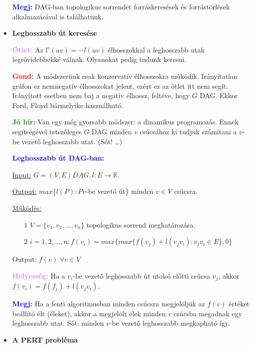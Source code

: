 \documentclass[../../szobeli.tex]{subfiles}
\begin{document}
\begin{itemize}
        \textcolor{blue}{\textbf{Megj:}} DAG-ban topologikus sorrendet forráskeresések és forrástörlések alkalmazásával is találhatunk.

        \item \textbf{Leghosszabb út keresése}

        \textcolor{violet}{\textbf{Ötlet:}} Az $l'(uv) = -l(uv)$ élhosszokkal a leghosszabb utak legrövidebbekké válnak. Olyanokat pedig tudunk keresni.

        \textcolor{red}{\textbf{Gond:}} A módszerünk csak konzervatív élhosszokra működik. Irányítatlan gráfon ez nemnegatív élhosszokat jelent, ezért ez az ötlet itt nem segít. Irányított esetben nem baj a negatív élhossz, feltéve, hogy $G$ DAG. Ekkor Ford, Floyd bármelyike használható.

        \textcolor{green}{\textbf{Jó hír:}} Van egy még gyorsabb módszer: a dinamikus programozás. Ennek segítségével tetszőleges $G$ DAG minden $v$ csúcsához ki tudjuk számítani a $v$-be vezető leghosszabb utat. (Sőt! \dots)

        \textcolor{blue}{\textbf{Leghosszabb út DAG-ban:}} 
        
        \underline{Input:} $G = (V,E) DAG, l:E \rightarrow \mathbb{R}.$ 
        
        \underline{Output:} $max$\{$l(P):P v$-be vezető út\} minden $v \in V$ csúcsra. 
        
        \underline{Működés:} \begin{itemize}
            \item[$\boxed{1}$] $V = \{v_1,v_2,\dots,v_n\}$ topologikus sorrend meghatározása.
            \item[$\boxed{2}$] $i = 1,2,\dots,n: f(v_i) = max\{max\{f(v_j)+l(v_jv_i):v_jv_i \in E\},0\}$ 
        \end{itemize}
        
        Output: $f(v)\; \forall v \in V$

        \textcolor{violet}{\textbf{Helyesség:}} Ha a $v_i$-be vezető leghosszabb út utolsó előtti csúcsa $v_j$, akkor $f(v_i) = f(f_j) + l(v_jv_i)$.

        \textcolor{blue}{\textbf{Megj:}} Ha a fenti algoritmusban minden csúcsra megjelöljük az $f(v)$ értéket beállító élt (éleket), akkor a megjelölt élek minden $v$ csúcsba megadnak egy leghosszabb utat. Sőt: minden $v$-be vezető leghosszabb megkapható így.

        \item \textbf{A PERT probléma}


\end{itemize}
\end{document}
